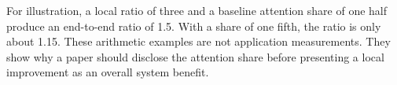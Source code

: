 For illustration, a local ratio of three and a baseline attention share of one half produce an end-to-end ratio of 1.5. With a share of one fifth, the ratio is only about 1.15. These arithmetic examples are not application measurements. They show why a paper should disclose the attention share before presenting a local improvement as an overall system benefit.
